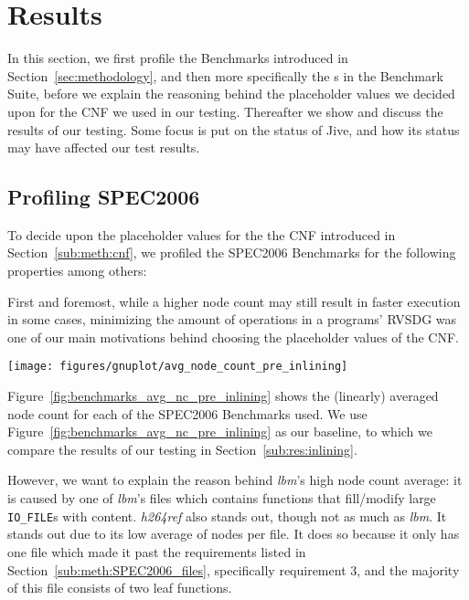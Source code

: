 
\clearpage
\section{Results}
\label{sec:res}

In this section, we first profile the Benchmarks introduced in
Section~\ref{sec:methodology}, and then more specifically the \applyNode s in
the Benchmark Suite, before we explain the reasoning behind the placeholder
values we decided upon for the CNF we used in our testing. Thereafter we show
and discuss the results of our testing. Some focus is put on the status of Jive,
and how its status may have affected our test results.

\subsection{Profiling SPEC2006}
\label{sub:res:profiling}

To decide upon the placeholder values for the the CNF introduced in
Section~\ref{sub:meth:cnf}, we profiled the SPEC2006 Benchmarks for the
following properties among others:

First and foremost, while a higher node count may still result in faster
execution in some cases, minimizing the amount of operations in a programs'
RVSDG was one of our main motivations behind choosing the placeholder values of
the CNF.

\begin{centering}
	\noindent\begin{minipage}{\textwidth}
		\captionsetup{type=figure}
		\hspace{-1em}
		\texttt{[image: figures/gnuplot/avg\_node\_count\_pre\_inlining]}
	\end{minipage}
	\label{fig:benchmarks_avg_nc_pre_inlining}
\end{centering}

Figure~\ref{fig:benchmarks_avg_nc_pre_inlining} shows the (linearly) averaged
node count for each of the SPEC2006 Benchmarks used. We use
Figure~\ref{fig:benchmarks_avg_nc_pre_inlining} as our baseline, to which we
compare the results of our testing in Section~\ref{sub:res:inlining}.

However, we want to explain the reason behind \textit{lbm}'s high node count
average: it is caused by one of \textit{lbm}'s files which contains functions
that fill/modify large \lstinline!IO_FILE!s with content. \textit{h264ref} also
stands out, though not as much as \textit{lbm}. It stands out due to its low
average of nodes per file. It does so because it only has one file which made it
past the requirements listed in Section~\ref{sub:meth:SPEC2006_files},
specifically requirement 3, and the majority of this file consists of two leaf
functions.

